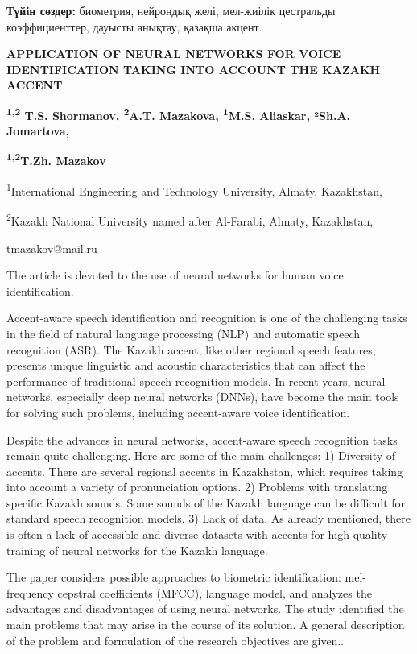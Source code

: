 {\bfseries Түйін сөздер:} биометрия, нейрондық желі, мел-жиілік цестральды
коэффициенттер, дауысты анықтау, қазақша акцент.

{\bfseries APPLICATION OF NEURAL NETWORKS FOR VOICE IDENTIFICATION TAKING
INTO ACCOUNT THE KAZAKH ACCENT}

{\bfseries \textsuperscript{1,2} T.S. Shormanov, \textsuperscript{2}A.T.
Mazakova, \textsuperscript{1}M.S. Aliaskar, ²Sh.A. Jomartova,}

{\bfseries \textsuperscript{1,2}T.Zh. Mazakov\textsuperscript{\envelope }}

\textsuperscript{1}International Engineering and Technology University,
Almaty, Kazakhstan,

\textsuperscript{2}Kazakh National University named after Al-Farabi,
Almaty, Kazakhstan,

tmazakov@mail.ru

The article is devoted to the use of neural networks for human voice
identification.

Accent-aware speech identification and recognition is one of the
challenging tasks in the field of natural language processing (NLP) and
automatic speech recognition (ASR). The Kazakh accent, like other
regional speech features, presents unique linguistic and acoustic
characteristics that can affect the performance of traditional speech
recognition models. In recent years, neural networks, especially deep
neural networks (DNNs), have become the main tools for solving such
problems, including accent-aware voice identification.

Despite the advances in neural networks, accent-aware speech recognition
tasks remain quite challenging. Here are some of the main challenges: 1)
Diversity of accents. There are several regional accents in Kazakhstan,
which requires taking into account a variety of pronunciation options.
2) Problems with translating specific Kazakh sounds. Some sounds of the
Kazakh language can be difficult for standard speech recognition models.
3) Lack of data. As already mentioned, there is often a lack of
accessible and diverse datasets with accents for high-quality training
of neural networks for the Kazakh language.

The paper considers possible approaches to biometric identification:
mel-frequency cepstral coefficients (MFCC), language model, and analyzes
the advantages and disadvantages of using neural networks. The study
identified the main problems that may arise in the course of its
solution. A general description of the problem and formulation of the
research objectives are given..

